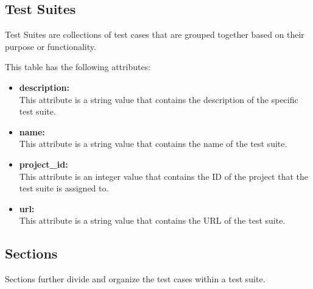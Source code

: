 \subsection{Test Suites}

Test Suites are collections of test cases that are grouped together based on their purpose or functionality.

This table has the following attributes:~\cite{TRSuites}
\begin{itemize}
    \item \textbf{description:} \\
    This attribute is a string value that contains the description of the specific test suite.

    \item \textbf{name:} \\
    This attribute is a string value that contains the name of the test suite.

    \item \textbf{project_id:} \\
    This attribute is an integer value that contains the ID of the project that the test suite is assigned to.

    \item \textbf{url:} \\
    This attribute is a string value that contains the URL of the test suite.
\end{itemize}

\subsection{Sections}

Sections further divide and organize the test cases within a test suite.

